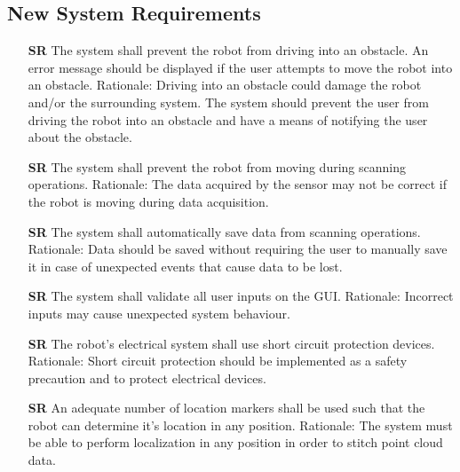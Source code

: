 \documentclass[12pt]{article}
\newcounter{srnum} %
\begin{document}
\subsection{New System Requirements}

\begin{itemize}

\item[\textbf{SR\refstepcounter{srnum}\thesrnum \label{SR1}}] The system shall prevent the robot from driving into an obstacle. An error message should be displayed if the user attempts to move the robot into an obstacle.
\newline Rationale: Driving into an obstacle could damage the robot and/or the surrounding system. The system should prevent the user from driving the robot into an obstacle and have a means of notifying the user about the obstacle.

\item[\textbf{SR\refstepcounter{srnum}\thesrnum \label{SR2}}] The system shall prevent the robot from moving during scanning operations.
\newline Rationale: The data acquired by the sensor may not be correct if the robot is moving during data acquisition.

\item[\textbf{SR\refstepcounter{srnum}\thesrnum \label{SR3}}] The system shall automatically save data from scanning operations.
\newline Rationale: Data should be saved without requiring the user to manually save it in case of unexpected events that cause data to be lost.

\item[\textbf{SR\refstepcounter{srnum}\thesrnum \label{SR5}}] The system shall validate all user inputs on the GUI.
\newline Rationale: Incorrect inputs may cause unexpected system behaviour.

\item[\textbf{SR\refstepcounter{srnum}\thesrnum \label{SR6}}] The robot's electrical system shall use short circuit protection devices.
\newline Rationale: Short circuit protection should be implemented as a safety precaution and to protect electrical devices.

\item[\textbf{SR\refstepcounter{srnum}\thesrnum \label{SR7}}] An adequate number of location markers shall be used such that the robot can determine it's location in any position.
\newline Rationale: The system must be able to perform localization in any position in order to stitch point cloud data.


\end{itemize}
\end{document}
